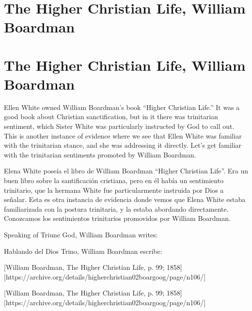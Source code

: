 \section*{The Higher Christian Life, William Boardman}


\section*{The Higher Christian Life, William Boardman}


Ellen White owned William Boardman's book “Higher Christian Life.” It was a good book about Christian sanctification, but in it there was trinitarian sentiment, which Sister White was particularly instructed by God to call out. This is another instance of evidence where we see that Ellen White was familiar with the trinitarian stance, and she was addressing it directly. Let's get familiar with the trinitarian sentiments promoted by William Boardman.


Elena White poseía el libro de William Boardman “Higher Christian Life”. Era un buen libro sobre la santificación cristiana, pero en él había un sentimiento trinitario, que la hermana White fue particularmente instruida por Dios a señalar. Esta es otra instancia de evidencia donde vemos que Elena White estaba familiarizada con la postura trinitaria, y la estaba abordando directamente. Conozcamos los sentimientos trinitarios promovidos por William Boardman.


Speaking of Triune God, William Boardman writes:


Hablando del Dios Trino, William Boardman escribe:


[William Boardman, The Higher Christian Life, p. 99; 1858][https://archive.org/details/higherchristian02boargoog/page/n106/]


[William Boardman, The Higher Christian Life, p. 99; 1858][https://archive.org/details/higherchristian02boargoog/page/n106/]


